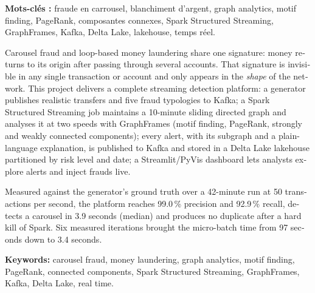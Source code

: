 \documentclass[11pt,a4paper]{report}
\makeatletter
\renewcommand\listoftables{\section*{\listtablename}\@starttoc{lot}}
\makeatother
\begin{document}
\vspace{2mm}
\noindent\textbf{Mots-clés :} fraude en carrousel, blanchiment d'argent, graph
analytics, motif finding, PageRank, composantes connexes, Spark Structured
Streaming, GraphFrames, Kafka, Delta Lake, lakehouse, temps réel.

\vspace{6mm}
\noindent{\color{grisligne}\rule{\linewidth}{0.6pt}}
\vspace{2mm}

\begin{otherlanguage}{english}

\vspace{3mm}
\noindent Carousel fraud and loop-based money laundering share one signature:
money returns to its origin after passing through several accounts. That
signature is invisible in any single transaction or account and only appears in
the \emph{shape} of the network. This project delivers a complete streaming
detection platform: a generator publishes realistic transfers and five fraud
typologies to Kafka; a Spark Structured Streaming job maintains a 10-minute
sliding directed graph and analyses it at two speeds with GraphFrames (motif
finding, PageRank, strongly and weakly connected components); every alert, with
its subgraph and a plain-language explanation, is published to Kafka and stored
in a Delta Lake lakehouse partitioned by risk level and date; a Streamlit/PyVis
dashboard lets analysts explore alerts and inject frauds live.

\smallskip
\noindent Measured against the generator's ground truth over a 42-minute run at
50 transactions per second, the platform reaches 99.0\,\% precision and
92.9\,\% recall, detects a carousel in 3.9 seconds (median) and produces no
duplicate after a hard kill of Spark. Six measured iterations brought the
micro-batch time from 97 seconds down to 3.4 seconds.

\vspace{2mm}
\noindent\textbf{Keywords:} carousel fraud, money laundering, graph analytics,
motif finding, PageRank, connected components, Spark Structured Streaming,
GraphFrames, Kafka, Delta Lake, real time.
\end{otherlanguage}

\tableofcontents
\clearpage{}
\listoffigures
\listoftables
\end{document}
